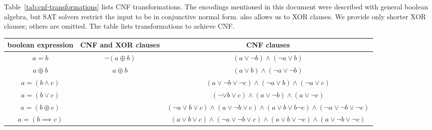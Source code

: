 Table~\ref{tab:cnf-transformations} lists CNF transformations. The encodings mentioned in this document were described with general boolean algebra, but SAT solvers restrict the input to be in conjunctive normal form. \cmsat{} also allows us to XOR clauses. We provide only shorter XOR clauses; others are omitted. The table lists transformations to achieve CNF.

\begin{sidewaystable}
  \begin{center}
    \begin{tabular}{ccc}
      boolean expression   & CNF and XOR clauses & CNF clauses \\
     \hline
      $a = b$              & $\neg (a \oplus b)$ & $(a \lor \neg b) \land (\neg a \lor b)$ \\
      $a \oplus b$         & $a \oplus b$        & $(a \lor b) \land (\neg a \lor \neg b)$ \\
      $a = (b \land c)$    &                     & $(a \lor \neg b \lor \neg c) \land (\neg a \lor b) \land (\neg a \lor c)$ \\
      $a = (b \lor c)$     &                     & $(\neg \lor b \lor c) \land (a \lor \neg b) \land (a \lor \neg c)$ \\
      $a = (b \oplus c)$   &                     & $(\neg a \lor b \lor c) \land (a \lor \neg b \lor c) \land (a \lor b \lor b \neg c) \land (\neg a \lor \neg b \lor \neg c)$ \\
      $a = (b \implies c)$ &                     & $(a \lor b \lor c) \land (\neg a \lor \neg b \lor c) \land (a \lor b \lor \neg c) \land (a \lor \neg b \lor \neg c)$ \\
    \end{tabular}
    \caption{CNF transformations.}
    \label{tab:cnf-transformations}
  \end{center}
\end{sidewaystable}
